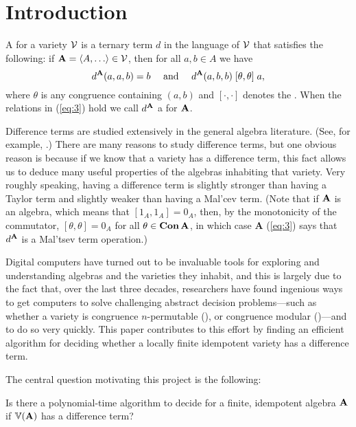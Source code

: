 \section{Introduction}
\label{sec:introduction}

A  for a variety $\mathcal{V}$ is a ternary term $d$ in the
language of $\mathcal{V}$ that satisfies the following:
if $\alg{A} = \<A, \dots \> \in \sV$, then for all $a, b \in A$ we have
\begin{equation}
\label{eq:3}  
d^{\mathbf{A}}(a,a,b) = b \quad \text{ and } \quad
d^{\mathbf{A}}(a,b,b) \mathrel{[\theta, \theta]} a,
\end{equation}
where $\theta$ is any congruence %
containing $(a,b)$
and $[\cdot, \cdot]$ denotes the .
When the relations in (\ref{eq:3}) hold we call $d^{\mathbf{A}}$
a  for $\mathbf{A}$.

Difference terms are studied extensively in the general algebra literature.
(See, for example, \cite{MR1358491,MR1663558,MR3076179,KSW,MR3449235}.)
There are many reasons to study difference terms, but
one obvious reason is because if we know that a variety 
has a difference term, this fact allows us to deduce many useful
properties of the algebras inhabiting that variety.
Very roughly speaking, having a difference term is slightly stronger than having
a Taylor term and slightly weaker than having a Mal'cev term.
(Note that if
$\mathbf{A}$ is an  algebra, which means 
that $[1_A, 1_A] = 0_A$, then, by
the monotonicity of the commutator,
$[\theta, \theta] = 0_A$ for all $\theta \in \operatorname{\mathbf{Con}} \mathbf{A}$, 
in which case $\textbf{A}$
(\ref{eq:3}) says that $d^{\mathbf{A}}$ is a Mal'tsev term operation.)

Digital computers have turned out to be invaluable tools for exploring and
understanding algebras and the varieties they inhabit, and this is largely due
to the fact that, over the last three decades,
researchers have found ingenious ways to get computers to
solve challenging abstract decision problems---such as whether a variety is
congruence $n$-permutable (\cite{MR3239624}), or
congruence modular (\cite{Freese:2009})---and to do so very quickly.
This paper contributes to this effort by finding an efficient
algorithm for deciding whether a locally finite idempotent variety has a
difference term.

The central question motivating this project is the following:
\begin{prob}
  \label{prob:1}
  Is there a polynomial-time algorithm to decide for a finite,
  idempotent algebra $\mathbf{A}$ if $\operatorname{\mathbb{V}}(\mathbf{A})$ has a difference term?
\end{prob}
 
